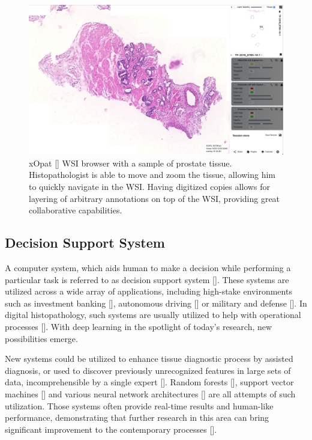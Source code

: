 \begin{figure}[!h]
    \begin{center}
    \begin{minipage}{0.75\textwidth}
      \includegraphics[width=\textwidth]{img/xopat.png}
    \end{minipage}
    \caption{xOpat [] WSI browser with a sample of prostate tissue. Histopathologist is able to move and zoom the tissue, allowing him to quickly navigate in the WSI. Having digitized copies allows for layering of arbitrary annotations on top of the WSI, providing great collaborative capabilities.}
    \label{fig:xopat}
    \end{center}
\end{figure}

\subsection*{Decision Support System}

A computer system, which aids human to make a decision while performing a particular task is referred to as decision support system []. These systems are utilized across a wide array of applications, including high-stake environments such as investment banking [], autonomous driving [] or military and defense []. In digital histopathology, such systems are usually utilized to help with operational processes []. With deep learning in the spotlight of today's research, new possibilities emerge.

New systems could be utilized to enhance tissue diagnostic process by assisted diagnosis, or used to discover previously unrecognized features in large sets of data, incomprehensible by a single expert [].
Random forests [], support vector machines [] and various neural network architectures [] are all attempts of such utilization. Those systems often provide real-time results and human-like performance, demonstrating that further research in this area can bring significant improvement to the contemporary processes [].

